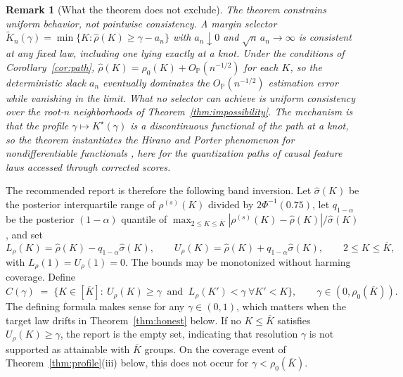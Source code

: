 \documentclass[11pt]{article}
\newtheorem{remark}{Remark}
\newcommand{\Pp}{\mathbb P}
\newcommand{\Op}{O_{\Pp}}
\begin{document}
\begin{remark}[What the theorem does not exclude]\label{rem:marginselector}
The theorem constrains uniform behavior, not pointwise consistency. A margin selector $\widetilde K_n(\gamma)=\min\{K:\hat\rho(K)\ge\gamma-a_n\}$ with $a_n\downarrow0$ and $\sqrt n\,a_n\to\infty$ is consistent at any fixed law, including one lying exactly at a knot. Under the conditions of Corollary~\ref{cor:path}, $\hat\rho(K)=\rho_0(K)+\Op(n^{-1/2})$ for each $K$, so the deterministic slack $a_n$ eventually dominates the $\Op(n^{-1/2})$ estimation error while vanishing in the limit. What no selector can achieve is uniform consistency over the root-$n$ neighborhoods of Theorem~\ref{thm:impossibility}. The mechanism is that the profile $\gamma\mapsto K^\star(\gamma)$ is a discontinuous functional of the path at a knot, so the theorem instantiates the Hirano and Porter phenomenon for nondifferentiable functionals \citep{hirano2012}, here for the quantization paths of causal feature laws accessed through corrected scores.
\end{remark}

The recommended report is therefore the following band inversion.  Let $\hat\sigma(K)$ be the posterior interquartile range of $\rho^{(s)}(K)$ divided by $2\Phi^{-1}(0.75)$, let $q_{1-\alpha}$ be the posterior $(1-\alpha)$ quantile of $\max_{2\le K\le\overline K}|\rho^{(s)}(K)-\hat\rho(K)|/\hat\sigma(K)$, and set
\begin{equation}\label{eq:band}
L_\rho(K)=\hat\rho(K)-q_{1-\alpha}\hat\sigma(K),\qquad
U_\rho(K)=\hat\rho(K)+q_{1-\alpha}\hat\sigma(K),\qquad 2\le K\le\overline K,
\end{equation}
with $L_\rho(1)=U_\rho(1)=0$.  The bounds may be monotonized without harming coverage.  Define
\begin{equation}\label{eq:profileset}
\widehat C(\gamma)\;=\;\bigl\{K\in[\overline K]:\ U_\rho(K)\ge\gamma\ \text{ and }\ L_\rho(K')<\gamma\ \forall K'<K\bigr\},
\qquad \gamma\in(0,\rho_0(\overline K)).
\end{equation}
The defining formula makes sense for any $\gamma\in(0,1)$, which matters when the target law drifts in Theorem~\ref{thm:honest} below. If no $K\le\overline K$ satisfies $U_\rho(K)\ge\gamma$, the report is the empty set, indicating that resolution $\gamma$ is not supported as attainable with $\overline K$ groups. On the coverage event of Theorem~\ref{thm:profile}(iii) below, this does not occur for $\gamma<\rho_0(\overline K)$.
\end{document}
